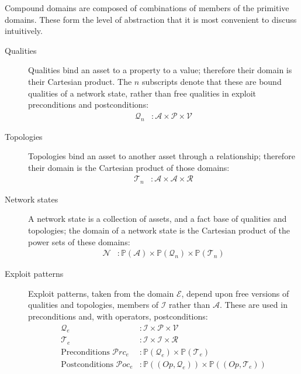 Compound domains are composed of combinations
of members of the primitive domains. These form the level of abstraction that it is
most convenient to discuss intuitively.
\begin{description}
    \item[Qualities] Qualities bind an asset to a property to a value; therefore their
        domain is their Cartesian product. The $n$ subscripts denote that
        these are bound qualities of a network state, rather than free qualities in
        exploit preconditions and postconditions:
        \begin{align*}
            \mathcal{Q}_n &: \mathcal{A} \times \mathcal{P} \times \mathcal{V}
        \end{align*}
    \item[Topologies] Topologies bind an asset to another asset through a relationship; therefore their
        domain is the Cartesian product of those domains:
        \begin{align*}
            \mathcal{T}_n&: \mathcal{A} \times \mathcal{A} \times \mathcal{R}
        \end{align*}
    \item[Network states] A network state is a collection of assets, and a fact base
        of qualities and topologies; the domain of a network state is the Cartesian product
        of the power sets of these domains:
        \begin{align*}
            \mathcal{N}&: \mathbb{P}(\mathcal{A}) \times \mathbb{P}(\mathcal{Q}_n) \times \mathbb{P}(\mathcal{T}_n)
        \end{align*}
    \item[Exploit patterns] Exploit patterns, taken from the domain $\mathcal{E}$,
		depend upon free versions of qualities and topologies,
		members of $\mathcal{I}$ rather than $\mathcal{A}$. These are used in
		preconditions and, with operators, postconditions:
        \begin{align*}
			\mathcal{Q}_e&: \mathcal{I} \times \mathcal{P} \times \mathcal{V} \\
			\mathcal{T}_e&: \mathcal{I} \times \mathcal{I} \times \mathcal{R} \\
			\text{Preconditions } \mathcal{P}rc_e &: \mathbb{P}(\mathcal{Q}_e) \times \mathbb{P}(\mathcal{T}_e) \\
			\text{Postconditions } \mathcal{P}oc_e&: \mathbb{P}((Op,\mathcal{Q}_e)) \times \mathbb{P}((Op,\mathcal{T}_e)) \\

\end{align*}
\end{description}

